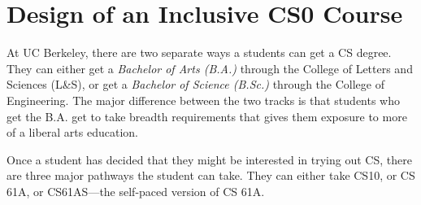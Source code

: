 \documentclass[oneside,titlepage,numbers=noenddot,headinclude,%
               footinclude=true,cleardoublepage=empty,abstractoff,BCOR=2mm,%
               paper=a4,fontsize=11pt,ngerman,american]{scrreprt}
\numberwithin{theorem}{chapter}
\numberwithin{definition}{chapter}
\numberwithin{algorithm}{chapter}
\numberwithin{figure}{chapter}
\numberwithin{table}{chapter}
\numberwithin{equation}{chapter}
\begin{document}
\section *{Design of an Inclusive CS0 Course}
At UC Berkeley, there are two separate ways a students can get a CS degree. They can either get a \emph{Bachelor of Arts (B.A.)} through the College of Letters and Sciences (L\&S), or get a \emph{Bachelor of Science (B.Sc.)} through the College of Engineering. The major difference between the two tracks is that students who get the B.A. get to take breadth requirements that gives them exposure to more of a liberal arts education. 

Once a student has decided that they might be interested in trying out CS, there are three major pathways the student can take. They can either take CS10, or CS 61A, or CS61AS---the self-paced version of CS 61A.
\end{document}
